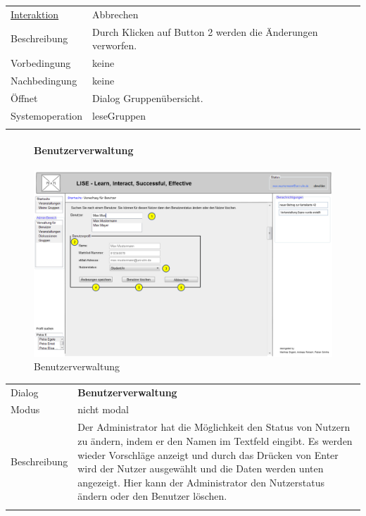 \documentclass[12pt,a4paper]{article}
\begin{document}
{\begin{tabular}{l p{12cm}}
	\underline{Interaktion} 	 & Abbrechen\\ 
	Beschreibung   	& Durch Klicken auf Button 2 werden die Änderungen verworfen.\\
	Vorbedingung	& keine \\
	Nachbedingung	& keine \\
	Öffnet			& Dialog \glqq Gruppenübersicht\grqq.\\
	Systemoperation & leseGruppen\\\\
\end{tabular}

\begin{figure}[H]
	\centering
	\paragraph{Benutzerverwaltung}
	\includegraphics[width=\textwidth]{Bilder/Mockups/GUI/Benutzerverwaltung[Admin].png}
	\caption{Benutzerverwaltung}
	\label{GuiBenutzerverwaltung}
\end{figure}
\begin{tabular}{l p{12cm}}
	Dialog 	 & \textbf{Benutzerverwaltung} \\ 
	Modus & nicht modal\\ 
	Beschreibung   	& Der Administrator hat die Möglichkeit den Status von Nutzern zu ändern, indem er den Namen im Textfeld eingibt. Es werden wieder Vorschläge anzeigt und durch das Drücken von Enter wird der Nutzer ausgewählt und die Daten werden unten angezeigt. Hier kann der Administrator den Nutzerstatus ändern oder den Benutzer löschen. \\\\
	

\end{tabular}}
\end{document}
